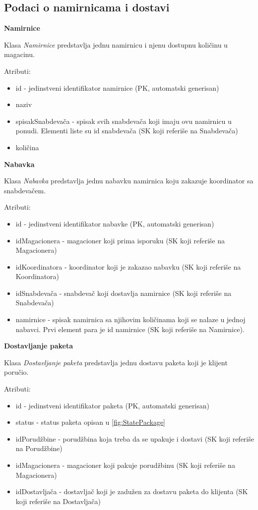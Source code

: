 \subsection{Podaci o namirnicama i dostavi}

\textbf{\large Namirnice}
\vspace{0.3cm}

Klasa \textit{Namirnice} predstavlja jednu namirnicu i njenu dostupnu količinu u magacinu.

Atributi:
\begin{itemize}
    \item id - jedinstveni identifikator namirnice (PK, automatski generisan)
    \item naziv 
    \item spisakSnabdevača - spisak svih snabdevača koji imaju ovu namirnicu u ponudi. Elementi liste su id snabdevača (SK koji referiše na Snabdevača)
    \item količina
\end{itemize}

\textbf{\large Nabavka}
\vspace{0.3cm}

Klasa \textit{Nabavka} predstavlja jednu nabavku namirnica koju zakazuje koordinator sa snabdevačem.

Atributi:
\begin{itemize}
    \item id - jedinstveni identifikator nabavke (PK, automatski generisan)
    \item idMagacionera - magacioner koji prima isporuku (SK koji referiše na Magacionera)
    \item idKoordinatora - koordinator koji je zakazao nabavku (SK koji referiše na Koordinatora)
    \item idSnabdevača - snabdevač koji dostavlja namirnice (SK koji referiše na Snabdevača) 
    \item namirnice - spisak namirnica sa njihovim količinama koji se nalaze u jednoj nabavci. Prvi element para je id namirnice  (SK koji referiše na Namirnice).
\end{itemize}

\textbf{\large Dostavljanje paketa}
\vspace{0.3cm}

Klasa \textit{Dostavljanje paketa} predstavlja jednu dostavu paketa  koji je klijent poručio.

Atributi:
\begin{itemize}
    \item id - jedinstveni identifikator paketa (PK, automatski generisan)
    \item status - status paketa opisan u \ref{fig:StatePackage}
    \item idPorudžbine - porudžbina koja treba da se upakuje i dostavi (SK koji referiše na Porudžbine)
    \item idMagacionera - magacioner koji pakuje porudžbinu (SK koji referiše na Magacionera)
    \item idDostavljača - dostavljač koji je zadužen za dostavu paketa do klijenta (SK koji referiše na Dostavljača)
\end{itemize}
